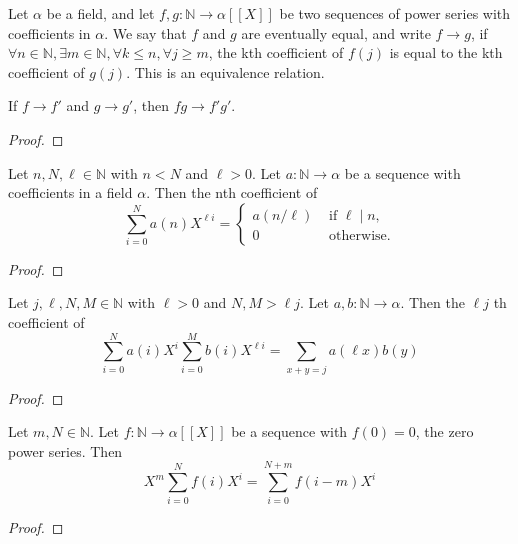 \begin{definition} 
  \label{def:eventuallyEq}
  \leanok
  Let $\alpha$ be a field, and let $f, g : \mathbb{N} \to \alpha [[X]]$ be two sequences of power series with coefficients in $\alpha$.
  We say that $f$ and $g$ are eventually equal, and write $f \longrightarrow g$, if
  $\forall n \in \mathbb{N}, \exists m \in \mathbb{N}, \forall k \le n, \forall j \ge m$, 
  the kth coefficient of $f(j)$ is equal to the kth coefficient of $g(j)$. This is an equivalence relation.
\end{definition}

\begin{theorem}
  \label{thm:eventuallyEq_mul}
  \leanok
  If $f \longrightarrow f'$ and $g \longrightarrow g'$, then $f g \longrightarrow f' g'$.
\end{theorem}
\begin{proof}
  \leanok
\end{proof}


\begin{lemma}
  \label{lem:coeff_sum_X_pow_mul}
  \leanok
  Let $n, N, \ell \in \mathbb{N}$ with $n < N$ and $\ell > 0$. Let $a : \mathbb{N} \to \alpha$ be a sequence with coefficients in a field $\alpha$.
  Then the nth coefficient of 
  \[ \sum_{i = 0}^{N} a (n) X ^ {\ell i} = 
      \begin{cases}
        a (n / \ell) & \text{ if } \ell \mid n, \\
        0 & \text{ otherwise.}
      \end{cases} \]

\end{lemma}
\begin{proof}
  \leanok
\end{proof}


\begin{lemma}
  \label{lem:coeff_sum_squash}
  \leanok
  Let $j, \ell, N, M \in \mathbb{N}$ with $\ell > 0$ and $N, M > \ell j$. 
  Let $a, b : \mathbb{N} \to \alpha$. Then the $\ell j$ th coefficient of
  \[ \sum_{i = 0}^{N} a (i) X ^ i \sum_{i = 0}^{M} b (i) X ^ {\ell i} = 
      \sum_{x + y = j} a (\ell x) b (y) \] 
\end{lemma}
\begin{proof}
  \leanok
\end{proof}


\begin{lemma}
  \label{lem:coeff_mul_shift_of_zero}
  \leanok
  Let $m, N \in \mathbb{N}$. Let $f : \mathbb{N} \to \alpha [[X]]$ be a sequence 
  with $f(0) = 0$, the zero power series. Then
  \[ X ^ m \sum_{i = 0}^{N} f (i) X ^ i = \sum_{i = 0}^{N + m} f (i - m) X ^ i \]
\end{lemma}
\begin{proof}
  \leanok
\end{proof}



